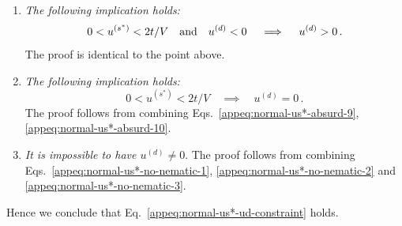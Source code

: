 \begin{tabproof}
\begin{enumerate}
	Let $0 < u^{(s^*)} < 2t/V$ and $u^{(d)} > 0$. Then $\epsilon^{(d)}>0$. From Tab.~\ref{tab:normal-ehm-ugamma-self-consistencies}, the self-consistency equation for $u^{(d)}$ reads
	\[
	\begin{aligned}
		u^{(d)} &= \frac{1}{L_x L_y} \sum_{\mathbf{k}\in\mathrm{BZ}} (\cos k_x - \cos k_y) f(\tilde{\epsilon}_\mathbf{k};\beta,\tilde{\mu}) \\
		&= \frac{1}{L_x L_y} \sum_{\mathbf{k}\in\mathrm{NBZ}} (\cos k_x - \cos k_y) \left[
		f(\tilde{\epsilon}_\mathbf{k};\beta,\tilde{\mu}) - f(\tilde{\epsilon}_{\mathcal{R}\mathbf{k}};\beta,\tilde{\mu})
		\right] \, ,
	\end{aligned}
	\]
	where we recognised, as is shown in Fig.~\ref{appsubfig:NBZ-sectors}, that $\mathrm{BZ} \setminus \mathrm{NBZ} = \mathcal{R} \mathrm{NBZ}$. It holds:
	\[
	\forall \mathbf{k} \in \mathrm{NBZ}
	\quad\colon\quad
	\begin{aligned}
		\tilde{\epsilon}_\mathbf{k} &= \epsilon^{(s^*)} \left( \cos k_x + \cos k_y \right) + \overbrace{\epsilon^{(d)}  \left( \cos k_x - \cos k_y \right) }^{\ge 0} \, ,\\
		\tilde{\epsilon}_{\mathcal{R}\mathbf{k}} &= \epsilon^{(s^*)} \left( \cos k_x + \cos k_y \right) - \underbrace{\epsilon^{(d)}  \left( \cos k_x - \cos k_y \right) }_{\ge 0} \, ,
	\end{aligned}
	\]
	thus $\tilde{\epsilon}_{\mathcal{R}\mathbf{k}} < \tilde{\epsilon}_\mathbf{k}$, and inserting this fact in the self-consistency equation above we get the absurd of Eq.~\eqref{appeq:normal-us*-absurd-9}.
	\item \textit{The following implication holds:}
	\begin{equation}\label{appeq:normal-us*-absurd-10}
		0 < u^{(s^*)} < 2t/V
		\qq{and}
		u^{(d)} < 0
		\quad\implies\quad
		u^{(d)} > 0 \, .
	\end{equation}
	The proof is identical to the point above.
	\item \textit{The following implication holds:}
	\begin{equation}\label{appeq:normal-us*-no-nematic-3}
		0 < u^{(s^*)} < 2t/V
		\quad\implies\quad
		u^{(d)} = 0 \, .
	\end{equation}
	The proof follows from combining Eqs.~\eqref{appeq:normal-us*-absurd-9}, \eqref{appeq:normal-us*-absurd-10}.
	\item \textit{It is impossible to have $u^{(d)} \neq 0$}. The proof follows from combining Eqs.~\eqref{appeq:normal-us*-no-nematic-1}, \eqref{appeq:normal-us*-no-nematic-2} and \eqref{appeq:normal-us*-no-nematic-3}.
\end{enumerate}
Hence we conclude that Eq.~\eqref{appeq:normal-us*-ud-constraint} holds.
\end{tabproof}


